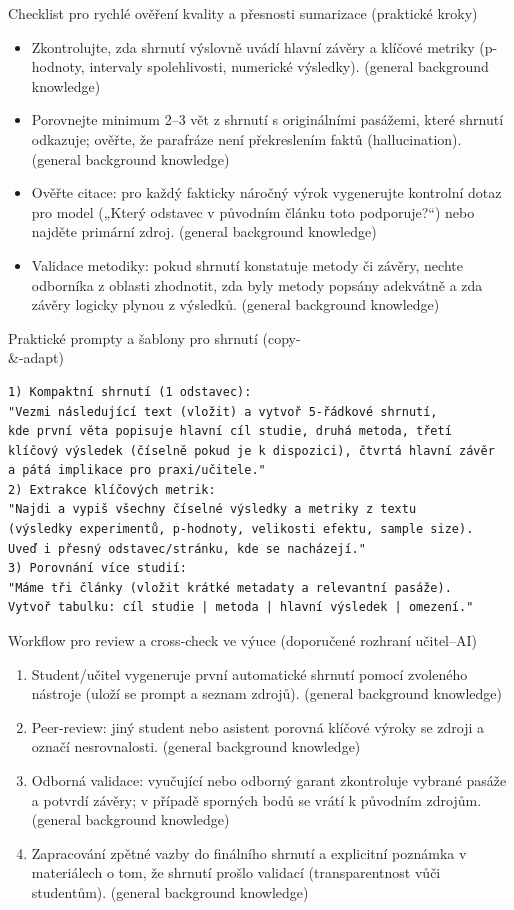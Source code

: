 Checklist pro rychlé ověření kvality a přesnosti sumarizace (praktické kroky)
\begin{itemize}
  \item Zkontrolujte, zda shrnutí výslovně uvádí hlavní závěry a klíčové metriky (p-hodnoty, intervaly spolehlivosti, numerické výsledky). (general background knowledge)
  \item Porovnejte minimum 2–3 vět z shrnutí s originálními pasážemi, které shrnutí odkazuje; ověřte, že parafráze není překreslením faktů (hallucination). (general background knowledge)
  \item Ověřte citace: pro každý fakticky náročný výrok vygenerujte kontrolní dotaz pro model („Který odstavec v původním článku toto podporuje?“) nebo najděte primární zdroj. (general background knowledge)
  \item Validace metodiky: pokud shrnutí konstatuje metody či závěry, nechte odborníka z oblasti zhodnotit, zda byly metody popsány adekvátně a zda závěry logicky plynou z výsledků. (general background knowledge)
\end{itemize}

Praktické prompty a šablony pro shrnutí (copy-\\ \&-adapt)
\begin{verbatim}
1) Kompaktní shrnutí (1 odstavec):
"Vezmi následující text (vložit) a vytvoř 5-řádkové shrnutí,
kde první věta popisuje hlavní cíl studie, druhá metoda, třetí
klíčový výsledek (číselně pokud je k dispozici), čtvrtá hlavní závěr
a pátá implikace pro praxi/učitele."
2) Extrakce klíčových metrik:
"Najdi a vypiš všechny číselné výsledky a metriky z textu
(výsledky experimentů, p-hodnoty, velikosti efektu, sample size).
Uveď i přesný odstavec/stránku, kde se nacházejí."
3) Porovnání více studií:
"Máme tři články (vložit krátké metadaty a relevantní pasáže).
Vytvoř tabulku: cíl studie | metoda | hlavní výsledek | omezení."
\end{verbatim}

Workflow pro review a cross‑check ve výuce (doporučené rozhraní učitel–AI)
\begin{enumerate}
  \item Student/učitel vygeneruje první automatické shrnutí pomocí zvoleného nástroje (uloží se prompt a seznam zdrojů). (general background knowledge)
  \item Peer‑review: jiný student nebo asistent porovná klíčové výroky se zdroji a označí nesrovnalosti. (general background knowledge)
  \item Odborná validace: vyučující nebo odborný garant zkontroluje vybrané pasáže a potvrdí závěry; v případě sporných bodů se vrátí k původním zdrojům. (general background knowledge)
  \item Zapracování zpětné vazby do finálního shrnutí a explicitní poznámka v materiálech o tom, že shrnutí prošlo validací (transparentnost vůči studentům). (general background knowledge)
\end{enumerate}

